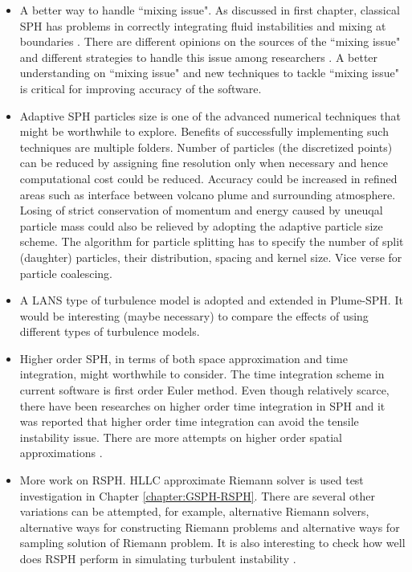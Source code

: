 \begin{itemize}
\item {A better way to handle ``mixing issue". As discussed in first chapter, classical SPH has problems in correctly integrating fluid instabilities and mixing at boundaries \citet{read2010resolving}. There are different opinions on the sources of the ``mixing issue" and different strategies to handle this issue among researchers \citep{chen1999improvement, ritchie2001multiphase, agertz2007fundamental, wadsley2008treatment, price2008modelling, read2010resolving, borgani2012hydrodynamic}. A better understanding on ``mixing issue" and new techniques to tackle ``mixing issue" is critical for improving accuracy of the software.}
\item Adaptive SPH particles size \citep{lopez2013dynamic, vacondio2016variable} is one of the advanced numerical techniques that might be worthwhile to explore. Benefits of successfully implementing such techniques are multiple folders. Number of particles (the discretized points) can be reduced by assigning fine resolution only when necessary and hence computational cost could be reduced. Accuracy could be increased in refined areas such as interface between volcano plume and surrounding atmosphere. Losing of strict conservation of momentum and energy caused by uneuqal particle mass could also be relieved by adopting the adaptive particle size scheme. The algorithm for particle splitting has to specify the number of split (daughter) particles, their distribution, spacing and kernel size. Vice verse for particle coalescing.
\item A LANS type of turbulence model is adopted and extended in Plume-SPH. It would be interesting (maybe necessary) to compare the effects of using different types of turbulence models.
\item Higher order SPH, in terms of both space approximation and time integration, might worthwhile to consider. The time integration scheme in current software is first order Euler method. Even though relatively scarce, there have been researches \citep{blanc2012stabilized} on higher order time integration in SPH and it was reported that higher order time integration can avoid the tensile instability issue. There are more attempts on higher order spatial approximations \citep{bonet1999variational, dilts1999moving, leonardi2014explicit, lind2016high}.
\item More work on RSPH. HLLC approximate Riemann solver is used test investigation in Chapter \ref{chapter:GSPH-RSPH}. There are several other variations can be attempted, for example, alternative Riemann solvers, alternative ways for constructing Riemann problems and alternative ways for sampling solution of Riemann problem. It is also interesting to check how well does RSPH perform in simulating turbulent instability \citep{price2008modelling,cha2010kelvin}. 
\end{itemize}

